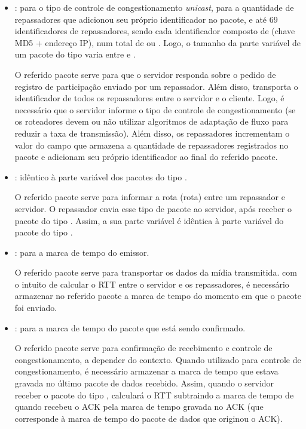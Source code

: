 \begin{itemize}
	\item {}:  para o tipo de controle de congestionamento \textit{unicast},  para a quantidade de repassadores que adicionou seu próprio identificador no pacote, e até 69   identificadores de repassadores, sendo cada identificador composto de  (chave MD5 + endereço IP), num total de  ou . Logo, o tamanho da parte variável de um pacote do tipo 
	 varia entre  e .
	
	O referido pacote serve para que o servidor responda sobre o pedido de registro de participação enviado por um repassador. Além disso, transporta o identificador de todos os repassadores entre o servidor e o cliente.
	Logo, é necessário que o servidor informe o tipo de controle de congestionamento (se os roteadores devem ou não utilizar algoritmos de adaptação de fluxo para reduzir a taxa de transmissão). Além disso, os repassadores incrementam o valor do campo que armazena a quantidade de repassadores registrados no pacote e adicionam seu próprio identificador ao final do referido pacote.
	
	\item {}: idêntico à parte variável dos pacotes do tipo .
	
	O referido pacote serve para informar a rota (rota) entre um repassador e  servidor. O repassador envia esse tipo de pacote ao servidor, após receber o pacote do tipo .
	Assim, a sua parte variável é idêntica à parte variável do pacote do tipo .
	
	\item {}:  para a marca de tempo do emissor.
	
	O referido pacote serve para transportar os dados da mídia transmitida. com o intuito de calcular o RTT entre o servidor e os repassadores, é necessário armazenar no referido pacote a marca de tempo do momento em que o pacote foi enviado.
	
	\item {}:  para a marca de tempo do pacote que está sendo confirmado.
	
	O referido pacote serve para confirmação de recebimento e controle de congestionamento, a depender do contexto. 
	Quando utilizado para controle de congestionamento, é necessário armazenar a marca de tempo que estava gravada no último pacote de dados recebido. Assim, quando o servidor receber o pacote do tipo , calculará o RTT subtraindo a marca de tempo de quando recebeu o ACK pela marca de tempo gravada no ACK (que corresponde à marca de tempo do pacote de dados que originou o ACK).
	

\end{itemize}
